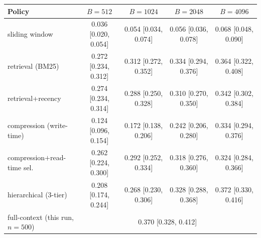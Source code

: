 \begin{tabular}{lcccc}
\toprule
Policy & $B{=}512$ & $B{=}1024$ & $B{=}2048$ & $B{=}4096$ \\
\midrule
sliding window & 0.036 [0.020, 0.054] & 0.054 [0.034, 0.074] & 0.056 [0.036, 0.078] & 0.068 [0.048, 0.090] \\
retrieval (BM25) & 0.272 [0.234, 0.312] & 0.312 [0.272, 0.352] & 0.334 [0.294, 0.376] & 0.364 [0.322, 0.408] \\
retrieval+recency & 0.274 [0.234, 0.314] & 0.288 [0.250, 0.328] & 0.310 [0.270, 0.350] & 0.342 [0.302, 0.384] \\
compression (write-time) & 0.124 [0.096, 0.154] & 0.172 [0.138, 0.206] & 0.242 [0.206, 0.280] & 0.334 [0.294, 0.376] \\
compression$+$read-time sel. & 0.262 [0.224, 0.300] & 0.292 [0.252, 0.334] & 0.318 [0.276, 0.360] & 0.324 [0.284, 0.366] \\
hierarchical (3-tier) & 0.208 [0.174, 0.244] & 0.268 [0.230, 0.306] & 0.328 [0.288, 0.368] & 0.372 [0.330, 0.416] \\
\midrule
full-context (this run, $n{=}500$) & \multicolumn{4}{c}{0.370 [0.328, 0.412]} \\
\bottomrule
\end{tabular}